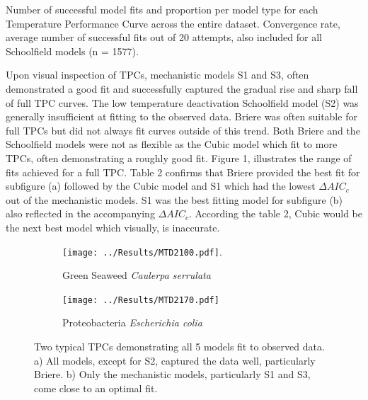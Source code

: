 \documentclass[11pt]{article}
\begin{document}
\begin{linenumbers}
\begin{table}[H]
\FloatBarrier
\centering
\caption{Number of successful model fits and proportion per model type for each Temperature Performance Curve across the entire dataset. Convergence rate, average number of successful fits out of 20 attempts, also included for all Schoolfield models (n = 1577).}
\begin{adjustbox}{height = 1.7cm, width=11cm}
\centering
 
\FloatBarrier
\end{adjustbox}
\end{table} 

Upon visual inspection of TPCs, mechanistic models S1 and S3, often demonstrated a good fit and successfully captured the gradual rise and sharp fall of full TPC curves. The low temperature deactivation Schoolfield model (S2) was generally insufficient at fitting to the observed data. Briere was often suitable for full TPCs but did not always fit curves outside of this trend. Both Briere and the Schoolfield models were not as flexible as the Cubic model which fit to more TPCs, often demonstrating a roughly good fit. Figure 1, illustrates the range of fits achieved for a full TPC. Table 2 confirms that Briere provided the best fit for subfigure (a) followed by the Cubic model and S1 which had the lowest \(\Delta AIC_c\) out of the mechanistic models. S1 was the best fitting model for subfigure (b) also reflected in the accompanying \(\Delta AIC_c\). According the table 2, Cubic would be the next best model which visually, is inaccurate.

\begin{figure}[H]
	\centering
	\begin{subfigure}{0.5\textwidth}
		\centering
		\texttt{[image: ../Results/MTD2100.pdf]}.
		\caption{Green Seaweed \textit{Caulerpa serrulata} }
		\label{fig:sub1}
	\end{subfigure}%
	\begin{subfigure}{0.5\textwidth}
		\centering
		\texttt{[image: ../Results/MTD2170.pdf]}
		\caption{ Proteobacteria \textit{Escherichia colia}}
		\label{fig:sub2}
	\end{subfigure}
	\caption{Two typical TPCs demonstrating all 5 models fit to observed data. a) All models, except for S2, captured the data well, particularly Briere. b) Only the mechanistic models, particularly S1	and S3, come close to an optimal fit.}
	\label{fig:test}
\end{figure}




\end{linenumbers}
\end{document}
